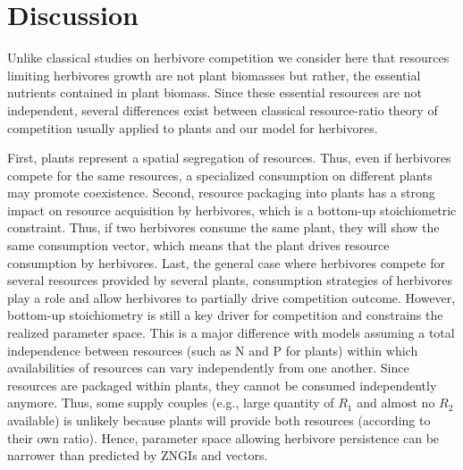 \documentclass[12pt]{article}
\begin{document}
\section*{Discussion}
Unlike classical studies on herbivore competition we consider here that resources limiting herbivores growth are not plant biomasses but rather, the essential nutrients contained in plant biomass. 
Since these essential resources are not independent, several differences exist between classical resource-ratio theory of competition usually applied to plants \citep{Tilman1980} and our model for herbivores.  %
\par
First, plants represent a spatial segregation of resources. Thus, even if herbivores compete for the same resources, a specialized consumption on different plants may promote coexistence. Second, resource packaging into plants has a strong impact on resource acquisition by herbivores, which is a bottom-up stoichiometric constraint. Thus, if two herbivores consume the same plant, they will show the same consumption vector, which means that the plant drives resource consumption by herbivores. 
Last, the general case where herbivores compete for several resources provided by several plants, consumption strategies of herbivores play a role and allow herbivores to partially drive competition outcome. However, bottom-up stoichiometry is still a key driver for competition and constrains the realized parameter space. This is a major difference with models assuming a total independence between resources (such as N and P for plants) within which availabilities of resources can vary independently from one another. %
Since resources are packaged within plants, they cannot be consumed independently anymore. Thus, some supply couples (e.g., large quantity of $R_1$ and almost no $R_2$ available) is unlikely because plants will provide both resources (according to their own ratio). Hence, parameter space allowing herbivore persistence can be narrower than predicted by ZNGIs and vectors.
\par
\end{document}
